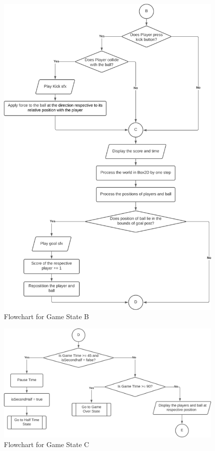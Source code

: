 \documentclass[main]{subfiles}
\begin{document}
        \begin{figure}[H]
            \centering
            \includegraphics[scale=0.5]{graphics/flowcharts/game_state2.png}
            \caption{Flowchart for Game State B}
            \label{fig:gamestateB}
        \end{figure}
        
        \begin{figure}[H]
            \centering
            \includegraphics[scale=0.5]{graphics/flowcharts/game_state3.png}
            \caption{Flowchart for Game State C}
            \label{fig:gamestateC}
        \end{figure}	
        
\end{document}
